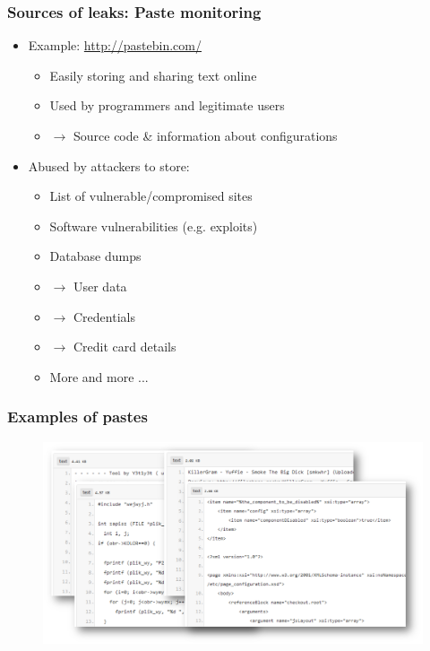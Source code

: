 \documentclass{beamer}
\begin{document}
\begin{frame}
    \frametitle{Sources of leaks: Paste monitoring}
    \begin{itemize}
        \item Example: \url{http://pastebin.com/}
            \begin{itemize}
                \item Easily storing and sharing text online
                \item Used by programmers and legitimate users
                \item[] $\to$ Source code \& information about configurations
            \end{itemize}
        \pause
        \item Abused by attackers to store:
            \begin{itemize}
                \item List of vulnerable/compromised sites
                \item Software vulnerabilities (e.g. exploits)
                \item Database dumps
                \item[] $\to$ User data
                \item[] $\to$ Credentials
                \item[] $\to$ Credit card details
                \item More and more ...
            \end{itemize}
    \end{itemize}
\end{frame}

\begin{frame}[t,plain]
    \frametitle{Examples of pastes}
    \begin{figure}
        \includegraphics[scale=0.32, angle=0]{images/pastes-ex.png}
    \end{figure}
\end{frame}
\end{document}
